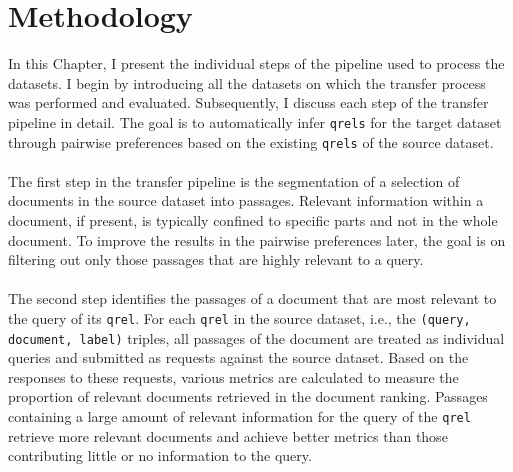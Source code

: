 \chapter{Methodology}\label{methodology}

In this Chapter, I present the individual steps of the pipeline used to process the datasets. I begin by introducing all the datasets on which the transfer process was performed and evaluated. Subsequently, I discuss each step of the transfer pipeline in detail. The goal is to automatically infer \texttt{qrels} for the target dataset through pairwise preferences based on the existing \texttt{qrels} of the source dataset.
\\\\
The first step in the transfer pipeline is the segmentation of a selection of documents in the source dataset into passages. Relevant information within a document, if present, is typically confined to specific parts and not in the whole document. To improve the results in the pairwise preferences later, the goal is on filtering out only those passages that are highly relevant to a query.
\\\\
The second step identifies the passages of a document that are most relevant to the query of its \texttt{qrel}. For each \texttt{qrel} in the source dataset, i.e., the \texttt{(query, document, label)} triples, all passages of the document are treated as individual queries and submitted as requests against the source dataset. Based on the responses to these requests, various metrics are calculated to measure the proportion of relevant documents retrieved in the document ranking. Passages containing a large amount of relevant information for the query of the \texttt{qrel} retrieve more relevant documents and achieve better metrics than those contributing little or no information to the query.

\pagebreak

